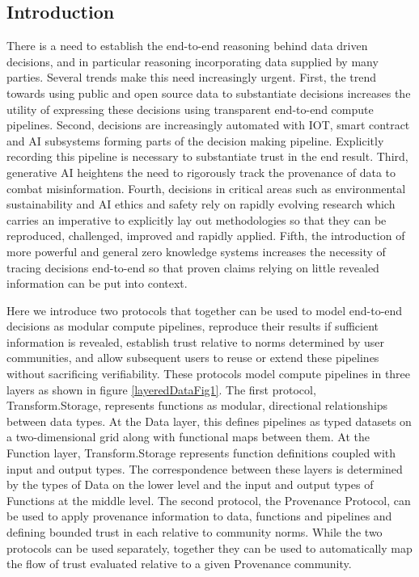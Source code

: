 \documentclass[9pt, oneside]{article}   	%
\begin{document}
\begin{multicols}{2}
\setlength{\parskip}{0.1\baselineskip} %
\section{Introduction}

There is a need to establish the end-to-end reasoning behind data driven decisions, and in particular reasoning incorporating data supplied by many parties. Several trends make this need increasingly urgent. First, the trend towards using public and open source data to substantiate decisions increases the utility of expressing these decisions using transparent end-to-end compute pipelines. Second, decisions are increasingly automated with IOT, smart contract and AI subsystems forming parts of the decision making pipeline. Explicitly recording this pipeline is necessary to substantiate trust in the end result. Third, generative AI heightens the need to rigorously track the provenance of data to combat misinformation. Fourth, decisions in critical areas such as environmental sustainability and AI ethics and safety rely on rapidly evolving research which carries an imperative to explicitly lay out methodologies so that they can be reproduced, challenged, improved and rapidly applied. Fifth, the introduction of more powerful and general zero knowledge systems increases the necessity of tracing decisions end-to-end so that proven claims relying on little revealed information can be put into context.

Here we introduce two protocols that together can be used to model end-to-end decisions as modular compute pipelines, reproduce their results if sufficient information is revealed, establish trust relative to norms determined by user communities, and allow subsequent users to reuse or extend these pipelines without sacrificing verifiability. These protocols model compute pipelines in three layers as shown in figure \ref{layeredDataFig1}. The first protocol, Transform.Storage, represents functions as modular, directional relationships between data types. At the Data layer, this defines pipelines as typed datasets on a two-dimensional grid along with functional maps between them. At the Function layer, Transform.Storage represents function definitions coupled with input and output types. The correspondence between these layers is determined by the types of Data on the lower level and the input and output types of Functions at the middle level. The second protocol, the Provenance Protocol, can be used to apply provenance information to data, functions and pipelines and defining bounded trust in each relative to community norms. While the two protocols can be used separately, together they can be used to automatically map the flow of trust evaluated relative to a given Provenance community.


\end{multicols}
\end{document}

